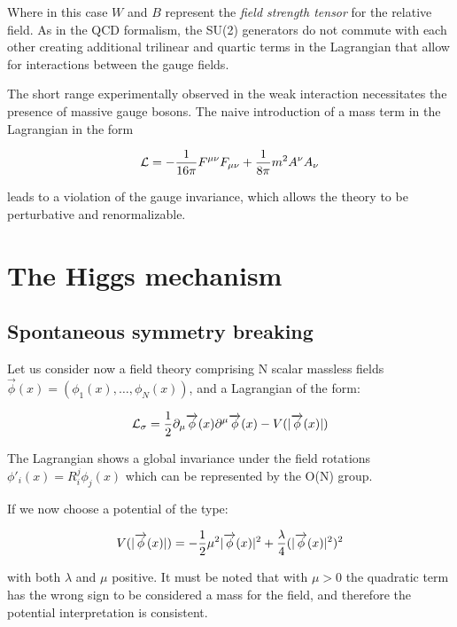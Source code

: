 Where in this case $W$ and $B$ represent the \emph{field strength tensor} for the relative field. As in the QCD formalism, the SU(2) generators do not commute with each other creating additional trilinear and quartic terms in the Lagrangian that allow for interactions between the gauge fields.

The short range experimentally observed in the weak interaction necessitates the presence of massive gauge bosons. The naive introduction of a mass term in the Lagrangian in the form

\begin{equation}
\mathcal{L} = -\frac{1}{16\pi}F^{\mu\nu}F_{\mu\nu}+\frac{1}{8\pi}m^2 A^{\nu}A_{\nu}
\label{eq:weak_free}
\end{equation}

leads to a violation of the gauge invariance, which allows the theory to be perturbative and renormalizable.

\section{The Higgs mechanism}

\subsection{Spontaneous symmetry breaking}

Let us consider now a field theory comprising N scalar massless fields $\vec{\phi}(x) = (\phi_1(x),\ldots,\phi_N(x))$, and a Lagrangian of the form:

\begin{equation}
\mathcal{L}_\sigma = \dfrac{1}{2} \partial_\mu \overrightarrow{\phi}(x) \partial^\mu \overrightarrow{\phi}(x) - V(|\overrightarrow{\phi}(x)|)
\label{eq:lin_sigma}
\end{equation}

The Lagrangian shows a global invariance under the field rotations $\phi'_i(x) = R_i^j \phi_j(x)$ which can be represented by the O(N) group. 

If we now choose a potential of the type:

\begin{equation}
V(|\overrightarrow{\phi}(x)|) = - \dfrac{1}{2} \mu^2 |\overrightarrow{\phi}(x)|^2 + \dfrac{\lambda}{4} (|\overrightarrow{\phi}(x)|^2)^2
\label{eq:lin_sigma}
\end{equation} 

with both $\lambda$ and $\mu$ positive. It must be noted that with $\mu > 0$ the quadratic term has the wrong sign to be considered a mass for the field, and therefore the potential interpretation is consistent.

